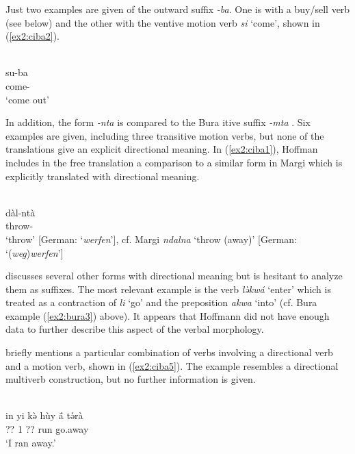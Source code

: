 Just two examples are given of the outward suffix \textit{-ba}. One is with a buy/sell verb (see below) and the other with the ventive motion verb \textit{si} `come', shown in (\ref{ex2:ciba2}). 

\ea\label{ex2:ciba2}
 \\
\gll su-ba  \\
come- \\
\glt `come out'
\z

In addition, the form \textit{-nta} is compared to the Bura itive suffix \textit{-mta} \citep[134]{hoffmannZurSpracheCibak1955}. Six examples are given, including three transitive motion verbs, but none of the translations give an explicit directional meaning. In (\ref{ex2:ciba1}), Hoffman includes in the free translation a comparison to a similar form in Margi which is explicitly translated with directional meaning.

\ea\label{ex2:ciba1}
 \\
\gll dàl-ntà \\
throw- \\
\glt `throw' [German: `\textit{werfen}'], cf. Margi \textit{ndalna} `throw (away)' [German: `(\textit{weg})\textit{werfen}']
\z 

\citet[136]{hoffmannZurSpracheCibak1955} discusses several other forms with directional meaning but is hesitant to analyze them as suffixes. The most relevant example is the verb \textit{lə̀kwá} `enter' which is treated as a contraction of \textit{li} `go' and the preposition \textit{akwa} `into' (cf. Bura example (\ref{ex2:bura3}) above). It appears that Hoffmann did not have enough data to further describe this aspect of the verbal morphology. 

\citet[140]{hoffmannZurSpracheCibak1955} briefly mentions a particular combination of verbs involving a directional verb and a motion verb, shown in (\ref{ex2:ciba5}). The example resembles a directional multiverb construction, but no further information is given.

\ea\label{ex2:ciba5}
 \\
\gll in yi kə̀ hùy ā́ tə́rà \\
?? 1 ?? run  go.away \\
\glt `I ran away.'
\z 

